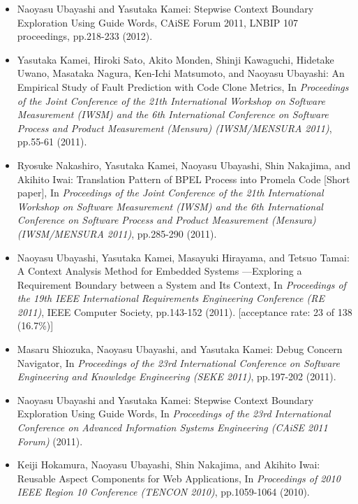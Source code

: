 \documentclass{article}
\begin{document}
\begin{itemize}
\item Naoyasu Ubayashi and Yasutaka Kamei:
Stepwise Context Boundary Exploration Using Guide Words,
CAiSE Forum 2011, LNBIP 107 proceedings,
pp.218-233 (2012).

\item Yasutaka Kamei, Hiroki Sato, Akito Monden, Shinji Kawaguchi, Hidetake Uwano, Masataka Nagura, Ken-Ichi Matsumoto, and Naoyasu Ubayashi:
An Empirical Study of Fault Prediction with Code Clone Metrics,
In {\em Proceedings of the Joint Conference of the 21th International Workshop on Software Measurement (IWSM) and the 6th International Conference on Software Process and Product Measurement (Mensura) (IWSM/MENSURA 2011)},
pp.55-61 (2011).

\item Ryosuke Nakashiro, Yasutaka Kamei, Naoyasu Ubayashi, Shin Nakajima, and Akihito Iwai:
Translation Pattern of BPEL Process into Promela Code [Short paper],
In {\em Proceedings of the Joint Conference of the 21th International Workshop on Software Measurement (IWSM) and the 6th International Conference on Software Process and Product Measurement (Mensura) (IWSM/MENSURA 2011)},
pp.285-290 (2011).

\item Naoyasu Ubayashi, Yasutaka Kamei, Masayuki Hirayama, and Tetsuo Tamai:
A Context Analysis Method for Embedded Systems ---Exploring a Requirement Boundary between a System and Its Context,
In {\em Proceedings of the 19th IEEE International Requirements Engineering Conference (RE 2011)},
IEEE Computer Society, pp.143-152 (2011).
[acceptance rate: 23 of 138 (16.7\%)]

\item Masaru Shiozuka, Naoyasu Ubayashi, and Yasutaka Kamei:
Debug Concern Navigator,
In {\em Proceedings of the 23rd International Conference on Software Engineering and Knowledge Engineering (SEKE 2011)},
pp.197-202 (2011).

\item Naoyasu Ubayashi and Yasutaka Kamei:
Stepwise Context Boundary Exploration Using Guide Words,
In {\em Proceedings of the 23rd International Conference on Advanced Information Systems Engineering (CAiSE 2011 Forum)} (2011).

\item Keiji Hokamura, Naoyasu Ubayashi, Shin Nakajima, and Akihito Iwai:
Reusable Aspect Components for Web Applications,
In {\em Proceedings of 2010 IEEE Region 10 Conference (TENCON 2010)},
pp.1059-1064 (2010).


\end{itemize}
\end{document}
